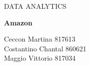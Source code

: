 \begin{titlepage}
	\begin{center}	
		\vspace{-30pt}
		
		\begin{doublespace}
			{\LARGE \uppercase{DATA ANALYTICS}}\\
		\end{doublespace}
		
		\vspace{+10pt}
		
		
		\vspace{+30pt}
		
		
		\vspace{+80pt}
		
		
		\begin{spacing}{1.8}
			{\huge \textbf{{Amazon}}}\\
		\end{spacing}
		
		
		
		
		\begin{flushleft}
			{\large Ceccon Martina	 817613} \\
			{\large Costantino Chantal 860621} \\
			{\large Maggio Vittorio 817034} \\
		\end{flushleft}
		
		
		
		
		
	\end{center}
\end{titlepage}
